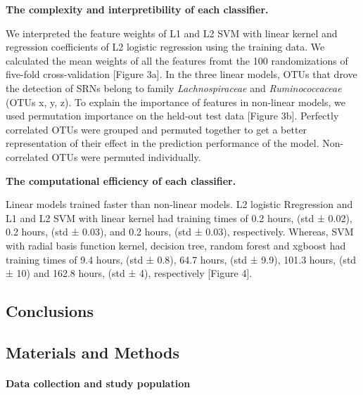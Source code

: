 \documentclass[11pt,]{article}
\let\oldparagraph\paragraph
\renewcommand{\paragraph}[1]{\oldparagraph{#1}\mbox{}}
\begin{document}
\textbf{The complexity and interpretibility of each classifier.}

We interpreted the feature weights of L1 and L2 SVM with linear kernel
and regression coefficients of L2 logistic regression using the training
data. We calculated the mean weights of all the features fromt the 100
randomizations of five-fold cross-validation {[}Figure 3a{]}. In the
three linear models, OTUs that drove the detection of SRNs belong to
family \emph{Lachnospiraceae} and \emph{Ruminococcaceae} (OTUs x, y, z).
To explain the importance of features in non-linear models, we used
permutation importance on the held-out test data {[}Figure 3b{]}.
Perfectly correlated OTUs were grouped and permuted together to get a
better representation of their effect in the prediction performance of
the model. Non-correlated OTUs were permuted individually.

\textbf{The computational efficiency of each classifier.}

Linear models trained faster than non-linear models. L2 logistic
Rregression and L1 and L2 SVM with linear kernel had training times of
0.2 hours, (std ± 0.02), 0.2 hours, (std ± 0.03), and 0.2 hours, (std ±
0.03), respectively. Whereas, SVM with radial basis function kernel,
decision tree, random forest and xgboost had training times of 9.4
hours, (std ± 0.8), 64.7 hours, (std ± 9.9), 101.3 hours, (std ± 10) and
162.8 hours, (std ± 4), respectively {[}Figure 4{]}.

\subsection{Conclusions}\label{conclusions}

\subsection{Materials and Methods}\label{materials-and-methods}

\paragraph{Data collection and study
population}\label{data-collection-and-study-population}
\end{document}
